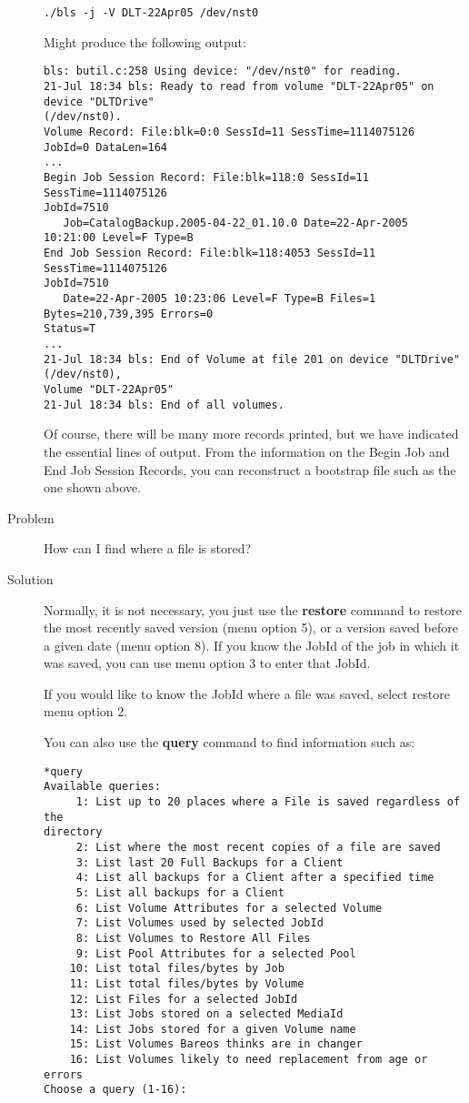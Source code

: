 \begin{description}
\footnotesize
\begin{verbatim}
./bls -j -V DLT-22Apr05 /dev/nst0
\end{verbatim}
\normalsize
  Might produce the following output:
\footnotesize
\begin{verbatim}
bls: butil.c:258 Using device: "/dev/nst0" for reading.
21-Jul 18:34 bls: Ready to read from volume "DLT-22Apr05" on device "DLTDrive"
(/dev/nst0).
Volume Record: File:blk=0:0 SessId=11 SessTime=1114075126 JobId=0 DataLen=164
...
Begin Job Session Record: File:blk=118:0 SessId=11 SessTime=1114075126
JobId=7510
   Job=CatalogBackup.2005-04-22_01.10.0 Date=22-Apr-2005 10:21:00 Level=F Type=B
End Job Session Record: File:blk=118:4053 SessId=11 SessTime=1114075126
JobId=7510
   Date=22-Apr-2005 10:23:06 Level=F Type=B Files=1 Bytes=210,739,395 Errors=0
Status=T
...
21-Jul 18:34 bls: End of Volume at file 201 on device "DLTDrive" (/dev/nst0),
Volume "DLT-22Apr05"
21-Jul 18:34 bls: End of all volumes.
\end{verbatim}
\normalsize
  Of course, there will be many more records printed, but we have indicated
  the essential lines of output. From the information on the Begin Job and End
  Job Session Records, you can reconstruct a bootstrap file such as the one
  shown above.

\item[Problem]
  How can I find where a file is stored?
\item[Solution]
  Normally, it is not necessary, you just use the {\bf restore} command to
  restore the most recently saved version (menu option 5), or a version
  saved before a given date (menu option 8).  If you know the JobId of the
  job in which it was saved, you can use menu option 3 to enter that JobId.

  If you would like to know the JobId where a file was saved, select
  restore menu option 2.

  You can also use the {\bf query} command to find information such as:
\footnotesize
\begin{verbatim}
*query
Available queries:
     1: List up to 20 places where a File is saved regardless of the
directory
     2: List where the most recent copies of a file are saved
     3: List last 20 Full Backups for a Client
     4: List all backups for a Client after a specified time
     5: List all backups for a Client
     6: List Volume Attributes for a selected Volume
     7: List Volumes used by selected JobId
     8: List Volumes to Restore All Files
     9: List Pool Attributes for a selected Pool
    10: List total files/bytes by Job
    11: List total files/bytes by Volume
    12: List Files for a selected JobId
    13: List Jobs stored on a selected MediaId
    14: List Jobs stored for a given Volume name
    15: List Volumes Bareos thinks are in changer
    16: List Volumes likely to need replacement from age or errors
Choose a query (1-16):
\end{verbatim}
\normalsize


\end{description}

